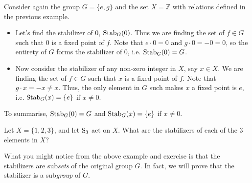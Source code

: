 \begin{example}
    Consider again the group $G = \{e, g\}$ and the set $X = \mathbb{Z}$ with relations defined in the previous example.
    \begin{itemize}
        \item Let's find the stabilizer of 0, $\mathrm{Stab}_{G}(0)$. Thus we are finding the set of $f \in G$ such that 0 is a fixed point of $f$. Note that $e \cdot 0 = 0$ and $g \cdot 0 = -0 = 0$, so the entirety of $G$ forms the stabilizer of 0, i.e. $\mathrm{Stab}_{G}(0) = G$.
        \item Now consider the stabilizer of any non-zero integer in $X$, say $x \in X$. We are finding the set of $f \in G$ such that $x$ is a fixed point of $f$. Note that $g \cdot x = -x \neq x$. Thus, the only element in $G$ such makes $x$ a fixed point is $e$, i.e. $\mathrm{Stab}_{G}(x) = \{e\}$ if $x \neq 0$.
    \end{itemize}
    To summarise, $\mathrm{Stab}_{G}(0) = G$ and $\mathrm{Stab}_{G}(x) = \{e\}$ if $x \neq 0$.
\end{example}

\begin{exercise}
    Let $X = \{1, 2, 3\}$, and let $\mathrm{S}_{3}$ act on $X$. What are the stabilizers of each of the 3 elements in $X$?
\end{exercise}

What you might notice from the above example and exercise is that the stabilizers are sub\textit{sets} of the original group $G$. In fact, we will prove that the stabilizer is a sub\textit{group} of $G$.

